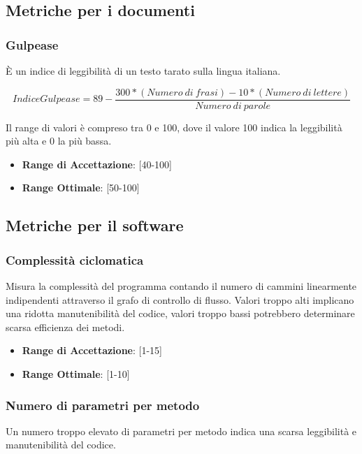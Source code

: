 \documentclass[12pt,a4paper]{article}
\begin{document}
\subsection{Metriche per i documenti}\label{metriche_doc}

\subsubsection{Gulpease}
È un indice di leggibilità di un testo tarato sulla lingua italiana.

\[IndiceGulpease=89-\frac{300*(Numero\ di\ frasi)-10*(Numero\ di\ lettere)}{Numero\ di\ parole}\]

Il range di valori è compreso tra 0 e 100, dove il valore 100 indica la leggibilità più alta e 0 la più bassa.

\begin{itemize}
\item \textbf{Range di Accettazione}: [40-100]
\item \textbf{Range Ottimale}: [50-100]
\end{itemize}

\subsection{Metriche per il software}\label{metriche_sw}

\subsubsection{Complessità ciclomatica}
Misura la complessità del programma contando il numero di cammini linearmente indipendenti attraverso il grafo di controllo di flusso. Valori troppo alti implicano una ridotta manutenibilità del codice, valori troppo bassi potrebbero determinare scarsa efficienza dei metodi.

\begin{itemize}
\item \textbf{Range di Accettazione}: [1-15]
\item \textbf{Range Ottimale}: [1-10]
\end{itemize}

\subsubsection{Numero di parametri per metodo}
Un numero troppo elevato di parametri per metodo indica una scarsa leggibilità e manutenibilità del codice.
\end{document}
